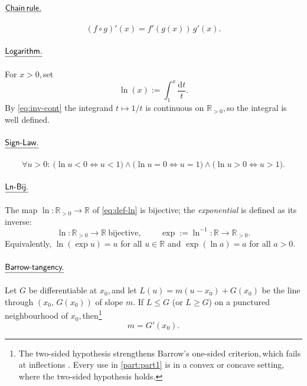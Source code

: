 \documentclass[11pt,reqno]{amsart}
\providecommand{\R}{\mathbb{R}}
\newcommand{\comma}{,\,\allowbreak}
\theoremstyle{redplain}
\begin{document}
\paragraph{$\textsf{\underline{Chain\,rule.}}$}\text{\ }
\begin{equation}\label{eq:chain-rule}
(f\circ g)'(x)=f'(g(x))\,g'(x).
\end{equation}

\paragraph{$\textsf{\underline{Logarithm.}}$}\text{\ } For $x>0$\comma set
\begin{equation}\label{eq:def-ln}
\ln(x):=\int_1^x \frac{\mathrm{d}t}{t}.
\end{equation}
By \autoref{eq:inv-cont} the integrand $t\mapsto 1/t$ is continuous on $\R_{>0}$\comma so the integral is well defined.

\paragraph{$\textsf{\underline{Sign-Law.}}$}\text{\ }
\begin{equation}\label{eq:sign-law}
\forall u>0:\ \bigl(\ln u<0\iff u<1\bigr)\wedge\bigl(\ln u=0\iff u=1\bigr)\wedge\bigl(\ln u>0\iff u>1\bigr).
\end{equation}

\paragraph{$\textsf{\underline{Ln-Bij.}}$}\text{\ } The map $\ln:\R_{>0}\to\R$ of \autoref{eq:def-ln} is bijective; the \emph{exponential} is defined as its inverse:
\begin{equation}\label{eq:ln-bij}
\ln:\R_{>0}\to\R\ \text{bijective}\comma\qquad \exp:=\ln^{-1}\colon\R\to\R_{>0}.
\end{equation}
Equivalently, $\ln(\exp u)=u$ for all $u\in\R$ and $\exp(\ln a)=a$ for all $a>0$.

\paragraph{$\textsf{\underline{Barrow-tangency.}}$}\text{\ } Let $G$ be differentiable at $x_0$\comma and let $L(u)=m(u-x_0)+G(x_0)$ be the line through $(x_0\comma G(x_0))$ of slope $m$. If $L\le G$ (or $L\ge G$) on a punctured neighbourhood of $x_0$\comma then\footnote{The two-sided hypothesis strengthens Barrow's one-sided criterion\comma which fails at inflections \cite{Lopez2026}. Every use in \autoref{part:part1} is in a convex or concave setting\comma where the two-sided hypothesis holds.}
\begin{equation}\label{eq:barrow-tangency}
m=G'(x_0).
\end{equation}
\end{document}
